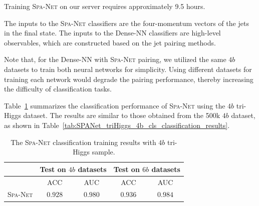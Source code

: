 \documentclass[12pt]{article}
\begin{document}
        Training \textsc{Spa-Net} on our server requires approximately 9.5 hours.

        The inputs to the \textsc{Spa-Net} classifiers are the four-momentum vectors of the jets in the final state. The inputs to the Dense-NN classifiers are high-level observables, which are constructed based on the jet pairing methods. 

        Note that, for the Dense-NN with \textsc{Spa-Net} pairing, we utilized the same $4b$ datasets to train both neural networks for simplicity. Using different datasets for training each network would degrade the pairing performance, thereby increasing the difficulty of classification tasks.

        Table~\ref{tab:SPANet_triHiggs_4b_1M_cls_classification_results} summarizes the classification performance of \textsc{Spa-Net} using the $4b$ tri-Higgs dataset. The results are similar to those obtained from the 500k $4b$ dataset, as shown in Table~\ref{tab:SPANet_triHiggs_4b_cls_classification_results}.
        \begin{table}[htpb]
            \centering
            \caption{The \textsc{Spa-Net} classification training results with $4b$ tri-Higgs sample.}
            \label{tab:SPANet_triHiggs_4b_1M_cls_classification_results}
            \begin{tabular}{c|cc|cc}
                             & \multicolumn{2}{c|}{Test on $4b$ datasets}& \multicolumn{2}{c}{Test on $6b$ datasets} \\ \hline
                             & ACC                 & AUC                 & ACC                 & AUC                 \\ \hline
            \textsc{Spa-Net} & $0.928$             & $0.980$             & $0.936$             & $0.984$
            \end{tabular}
        \end{table}
\end{document}

